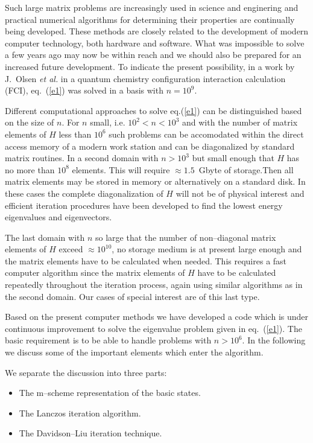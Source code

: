 Such large matrix problems are increasingly used in science and
enginering and practical numerical algorithms for determining their
properties are continually being developed\cite{dav89}.
These methods are closely related to the development of modern
computer technology, both  hardware and software.
What was impossible to solve a few years ago may now be within
reach and we should also be prepared for an increased  future
development. To indicate the present possibility,
in a work by J.~Olsen {\sl et al.}\cite{ols90} in a quantum
chemistry configuration interaction calculation (FCI), eq.~(\ref{e1})
was solved in a basis with $n = 10^{9}$.

Different computational approaches to solve eq.(\ref{e1}) can
be distinguished
based on the size of $n$.
For $n$ small, i.e. $10^2 < n < 10^3$ and with  the number of
matrix elements of $H$
less than $10^6$ such  problems can be accomodated within the direct
access memory of a modern work station and can be diagonalized by
standard matrix routines.
In a second domain  with  $ n > 10^3$ but small enough that $H$
has no more than $10^8$ elements. This will require $\approx 1.5$~Gbyte
of storage.Then all matrix elements may be stored in memory
or alternatively on a standard disk.
In these cases the complete diagonalization of
$H$ will not be of physical interest and efficient iteration
procedures have been developed to find the lowest energy eigenvalues
and eigenvectors.

The last domain with $n$ so large that the number of
non--diagonal matrix elements
of $H$ exceed $\approx 10^{10}$, no storage medium is at present large
enough  and the matrix elements have to be calculated when needed.
This requires a fast computer algorithm since the matrix elements of
$H$ have to be calculated repeatedly throughout the iteration process,
again using similar algorithms as in the second domain. Our cases of
special interest are of this last type.

Based on the present computer methods we have developed a code
which is under continuous improvement
to solve the eigenvalue problem given in eq.~(\ref{e1}).
The basic requirement
is to be able to handle problems with $n > 10^6$. In the following
we discuss some of the important elements which enter the algorithm.

We separate the discussion into three parts:
%
\begin{itemize}
%
\item The m--scheme representation of the basic states.
%
\item The Lanczos iteration algorithm.
%
\item The Davidson--Liu iteration technique.
%
\end{itemize}
%
